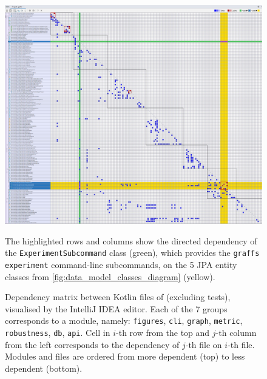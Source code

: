 \begin{figure}
    \includegraphics[width=\linewidth]{classes_dependency_matric.png}
    \caption{Dependency matrix between Kotlin files of \graffs (excluding tests), visualised by the IntelliJ IDEA editor.
    Each of the 7 groups corresponds to a module, namely: \texttt{figures}, \texttt{cli}, \texttt{graph}, \texttt{metric}, \texttt{robustness}, \texttt{db}, \texttt{api}.
    Cell in $i$-th row from the top and $j$-th column from the left corresponds to the dependency of $j$-th file on $i$-th file.
    Modules and files are ordered from more dependent (top) to less dependent (bottom).}
    \label{fig:classes_dependency_matrix}
    \footnotesize\justify\vspace{-0.4\baselineskip}
    The highlighted rows and columns show the directed dependency of the \texttt{ExperimentSubcommand} class (green), which provides the \texttt{graffs experiment} command-line subcommands, on the 5 JPA entity classes from \cref{fig:data_model_classes_diagram} (yellow).
\end{figure}
